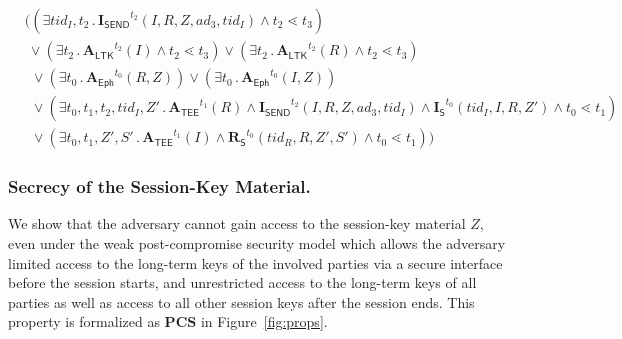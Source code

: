 \documentclass[runningheads]{llncs}
\newcommand{\mFunStyle}[1]{\textsf{#1}}
\newcommand{\mRevLTK}{\ensuremath{\mathbf{A}_\mFunStyle{LTK}}}
\newcommand{\mTEE}{\ensuremath{\mathbf{A}_\mFunStyle{TEE}}}
\newcommand{\mRevEph}{\ensuremath{\mathbf{A}_\mFunStyle{Eph}}}
\newcommand{\mIStart}{\ensuremath{\mathbf{I}_\mFunStyle{S}}}
\newcommand{\mRStart}{\ensuremath{\mathbf{R}_\mFunStyle{S}}}
\newcommand{\mISend}{\ensuremath{\mathbf{I}_{\mFunStyle{SEND}}}}
\newcommand{\mPredPcs}{\ensuremath{\mathbf{PCS}}}
\DeclareMathOperator{\mLogicDot}{.}
\newcommand{\mSessKey}{\ensuremath{Z}}
\newcommand{\mTID}{\ensuremath{\mathit{tid}}}
\newcommand{\mADthree}{\ensuremath{\mathit{ad}_3}}
\begin{document}
\begin{figure*}[htp]
\begin{align*}
	& ( (\exists \mTID_{I}, t_{2}\mLogicDot \mISend^{t_{2}}(I, R, \mSessKey, \mADthree, \mTID_{I}) \land t_{2} \lessdot t_{3}) \\
	&\ \lor (\exists t_{2}\mLogicDot \mRevLTK^{t_{2}}(I) \land t_{2} \lessdot t_{3}) \lor(\exists t_{2}\mLogicDot \mRevLTK^{t_{2}}(R) \land t_{2} \lessdot t_{3}) \\
	&\ \ \lor(\exists t_0\mLogicDot \mRevEph^{t_0}(R, \mSessKey))
     \lor(\exists t_0\mLogicDot \mRevEph^{t_0}(I, \mSessKey)) \\
     &\ \ \lor(\exists t_{0}, t_{1}, t_{2}, \mTID_{I}, Z'\mLogicDot \mTEE^{t_{1}}(R) \land \mISend^{t_{2}}(I, R, \mSessKey, \mADthree, \mTID_{I}) \land \mIStart^{t_{0}}(\mTID_{I}, I, R, Z') \land t_{0} \lessdot t_{1}) \\
     &\ \ \lor(\exists t_{0}, t_{1}, Z', S'\mLogicDot \mTEE^{t_{1}}(I) \land \mRStart^{t_{0}}(\mTID_{R}, R, Z', S') \land t_{0} \lessdot t_{1})
	)
\end{align*}
\caption{Formalization of security properties}
\label{fig:props}
\end{figure*}


\subsubsection{Secrecy of the Session-Key Material.}
\label{sec:secrecy}
We show that the adversary cannot gain access to the session-key material
\mSessKey{}, even under the weak post-compromise security model which allows 
the
adversary limited access to the long-term keys of the involved parties via
a
secure interface before the session starts, and unrestricted access to the long-term
keys of all parties as well as access to all other session keys after the session ends.
%
This property is formalized as \mPredPcs{} in Figure~\ref{fig:props}.
%
\end{document}
